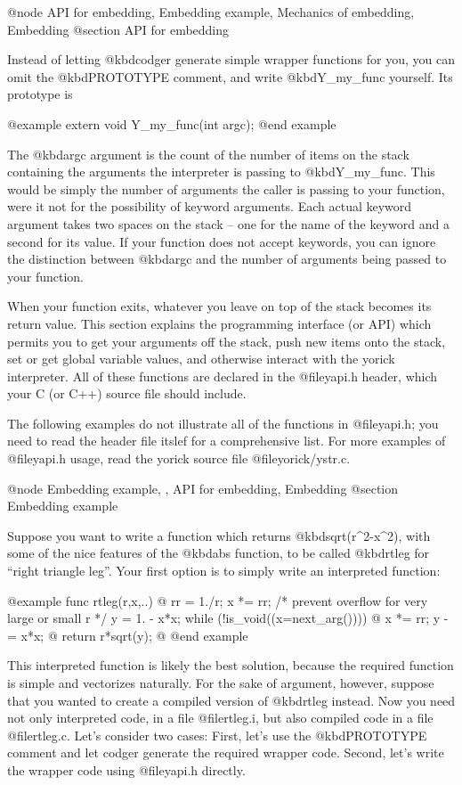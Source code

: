 @node API for embedding, Embedding example, Mechanics of embedding, Embedding
@section API for embedding

Instead of letting @kbd{codger} generate simple wrapper functions
for you, you can omit the @kbd{PROTOTYPE} comment, and write
@kbd{Y_my_func} yourself.  Its prototype is

@example
extern void Y_my_func(int argc);
@end example

The @kbd{argc} argument is the count of the number of items on the stack
containing the arguments the interpreter is passing to @kbd{Y_my_func}.
This would be simply the number of arguments the caller is passing to
your function, were it not for the possibility of keyword arguments.
Each actual keyword argument takes two spaces on the stack -- one for
the name of the keyword and a second for its value.  If your function
does not accept keywords, you can ignore the distinction between
@kbd{argc} and the number of arguments being passed to your function.

When your function exits, whatever you leave on top of the stack becomes
its return value.  This section explains the programming interface (or
API) which permits you to get your arguments off the stack, push new
items onto the stack, set or get global variable values, and otherwise
interact with the yorick interpreter.  All of these functions are
declared in the @file{yapi.h} header, which your C (or C++) source file
should include.

The following examples do not illustrate all of the functions in
@file{yapi.h}; you need to read the header file itslef for a
comprehensive list.  For more examples of @file{yapi.h} usage, read
the yorick source file @file{yorick/ystr.c}.

@node Embedding example,  , API for embedding, Embedding
@section Embedding example

Suppose you want to write a function which returns
@kbd{sqrt(r^2-x^2)}, with some of the nice features of the @kbd{abs}
function, to be called @kbd{rtleg} for ``right triangle leg''.  Your
first option is to simply write an interpreted function:

@example
func rtleg(r,x,..)
@{
  rr = 1./r;
  x *= rr;  /* prevent overflow for very large or small r */
  y = 1. - x*x;
  while (!is_void((x=next_arg()))) @{ x *= rr; y -= x*x; @}
  return r*sqrt(y);
@}
@end example

This interpreted function is likely the best solution, because the
required function is simple and vectorizes naturally.  For the sake of
argument, however, suppose that you wanted to create a compiled
version of @kbd{rtleg} instead.  Now you need not only interpreted
code, in a file @file{rtleg.i}, but also compiled code in a file
@file{rtleg.c}.  Let's consider two cases: First, let's use the
@kbd{PROTOTYPE} comment and let codger generate the required wrapper
code.  Second, let's write the wrapper code using @file{yapi.h}
directly.

